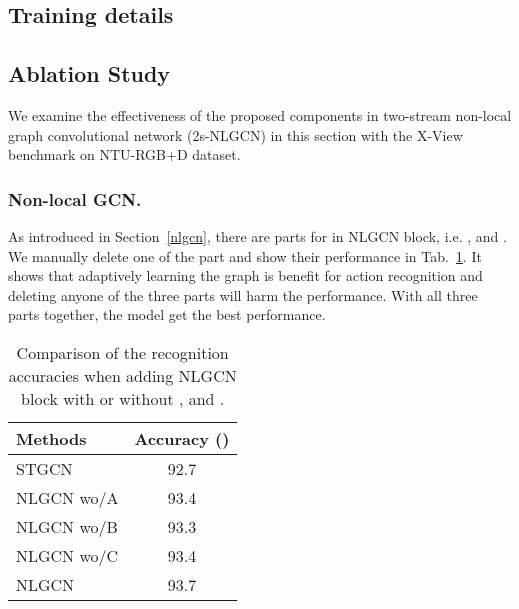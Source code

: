 \documentclass[10pt,twocolumn,letterpaper]{article}
\begin{document}
    \subsection{Training details}
     






    \subsection{Ablation Study}
    \label{sec:ablation}
    We examine the effectiveness of the proposed components in two-stream non-local graph convolutional network (2s-NLGCN) in this section with the X-View benchmark on NTU-RGB+D dataset.














    \subsubsection{Non-local GCN.}
    As introduced in Section~\ref{nlgcn}, there are  parts for in NLGCN block, i.e. ,  and . We manually delete one of the part and show their performance in Tab.~\ref{tab:nlgcn}. It shows that adaptively learning the graph is benefit for action recognition and deleting anyone of the three parts will harm the performance. With all three parts together, the model get the best performance.


\begin{table}[htb]
 	\begin{center}
		\label{tab:nlgcn}
		\begin{tabular}{lc}
			\hline
			Methods     & Accuracy ()    \\
			\hline
			STGCN & 92.7        \\
            NLGCN wo/A  & 93.4          \\
            NLGCN wo/B  & 93.3          \\
			NLGCN wo/C  & 93.4       \\
            NLGCN     & 93.7          \\
			\hline
		\end{tabular}
        \end{center}
     	\caption{Comparison of the recognition accuracies when adding NLGCN block with or without ,  and .}
	\end{table}
    
\end{document}
